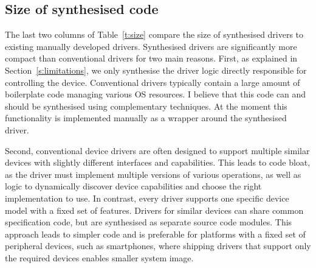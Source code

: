 
\subsection{Size of synthesised code} 
The last two columns of Table~\ref{t:size} compare the size of synthesised drivers to existing manually developed drivers.  Synthesised drivers are significantly more compact than conventional drivers for two main reasons.  First, as explained in Section~\ref{s:limitations}, we only synthesise the driver logic directly responsible for controlling the device.  Conventional drivers typically contain a large amount of boilerplate code managing various OS resources.  I believe that this code can and should be synthesised using complementary techniques.  At the moment this functionality is implemented manually as a wrapper around the synthesised driver. 

Second, conventional device drivers are often designed to support multiple similar devices with slightly different interfaces and capabilities.  This leads to code bloat, as the driver must implement multiple versions of various operations, as well as logic to dynamically discover device capabilities and choose the right implementation to use.  In contrast, every \termite driver supports one specific device model with a fixed set of features.  Drivers for similar devices can share common specification code, but are synthesised as separate source code modules.  This approach leads to simpler code and is preferable for platforms with a fixed set of peripheral devices, such as smartphones, where shipping drivers that support only the required devices enables smaller system image.
  
